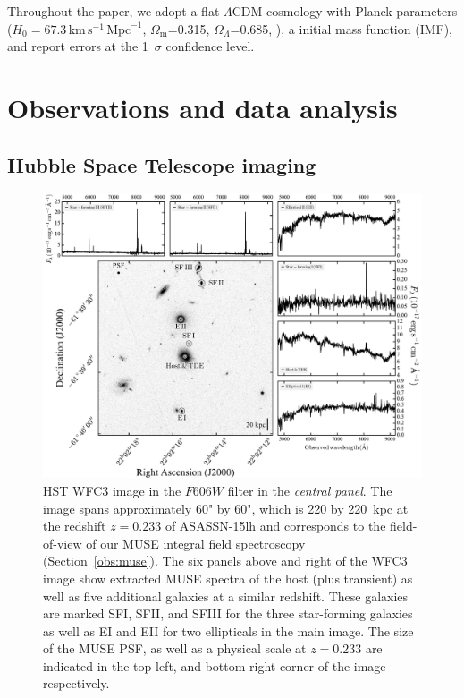 \documentclass[traditabstract]{aa}
\begin{document}
Throughout the paper, we adopt a flat $\Lambda$CDM cosmology with Planck parameters ($H_0=67.3\,\mathrm{km}\,\mathrm{s}^{-1}\,\mathrm{Mpc}^{-1}$, $\Omega_\mathrm{m}$=0.315, $\Omega_\Lambda$=0.685, \citealt{2014A&A...571A..16P}), a \citet{2003PASP..115..763C} initial mass function (IMF), and report errors at the 1~$\sigma$ confidence level.

\section{Observations and data analysis}
\label{sec:Obs}

\subsection{Hubble Space Telescope imaging}
\label{obs:hst}


\begin{figure}
  \includegraphics[width=0.999\linewidth]{fig/MUSE_ASASSN-15lh_wfc.pdf}
\caption{HST WFC3 image in the $F606W$ filter in the \textit{central panel}. The image spans approximately 60" by 60", which is 220 by 220~kpc at the redshift $z=0.233$ of ASASSN-15lh and corresponds to the field-of-view of our MUSE integral field spectroscopy (Section~\ref{obs:muse}). The six panels above and right of the WFC3 image show extracted MUSE spectra of the host (plus transient) as well as five additional galaxies at a similar redshift. These galaxies are marked SFI, SFII, and SFIII for the three star-forming galaxies as well as EI and EII for two ellipticals in the main image. The size of the MUSE PSF, as well as a physical scale at $z=0.233$ are indicated in the top left, and bottom right corner of the image respectively.}
\label{fig:fc}
\end{figure}
\end{document}
